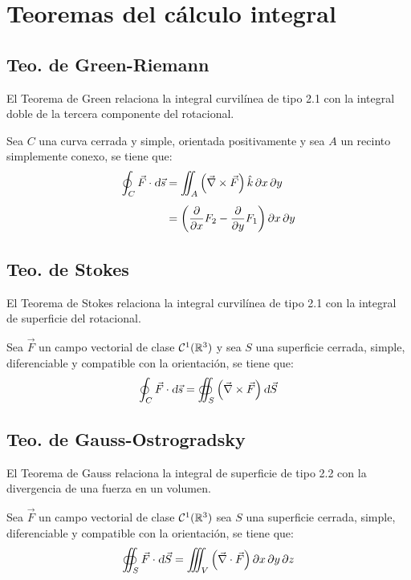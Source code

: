 \documentclass[a5paper,12pt,twoside]{book}
\begin{document}
\chapter{Teoremas del cálculo integral}


\section{Teo. de Green-Riemann}

El Teorema de Green relaciona la integral curvilínea de tipo 2.1 con la integral doble de la tercera componente del rotacional.

Sea $C$ una curva cerrada y simple, orientada positivamente y sea $A$ un recinto simplemente conexo, se tiene que:
\begin{align*}
    \oint_C \Vec{F} \cdot \textsl{d} \Vec{s}
    &= \iint_A \left( \Vec{\nabla} \times \Vec{F} \right) \hat{k} \, \partial x \, \partial y
    \\[1ex]
    &= \left( \dfrac{\partial}{\partial x} F_2 - \dfrac{\partial}{\partial y} F_1 \right) \partial x \, \partial y
\end{align*}


\section{Teo. de Stokes}

El Teorema de Stokes relaciona la integral curvilínea de tipo 2.1 con la integral de superficie del rotacional.

Sea $\Vec{F}$ un campo vectorial de clase $\mathcal{C}^{1} (\mathbb{R}^3)$ y sea $S$ una superficie cerrada, simple, diferenciable y compatible con la orientación, se tiene que:
\begin{equation*}
    \oint_C \Vec{F} \cdot \textsl{d} \Vec{s} = \oiint_S \left( \Vec{\nabla} \times \Vec{F} \right) \textsl{d} \Vec{S}
\end{equation*}


\section{Teo. de Gauss-Ostrogradsky}

El Teorema de Gauss relaciona la integral de superficie de tipo 2.2 con la divergencia de una fuerza en un volumen.

Sea $\Vec{F}$ un campo vectorial de clase $\mathcal{C}^{1} (\mathbb{R}^3)$ sea $S$ una superficie cerrada, simple, diferenciable y compatible con la orientación, se tiene que:
\begin{equation*}
    \oiint_S \Vec{F} \cdot \textsl{d} \Vec{S} = \iiint_V \left( \Vec{\nabla} \cdot \Vec{F} \right) \partial x \, \partial y \, \partial z
\end{equation*}
\end{document}
